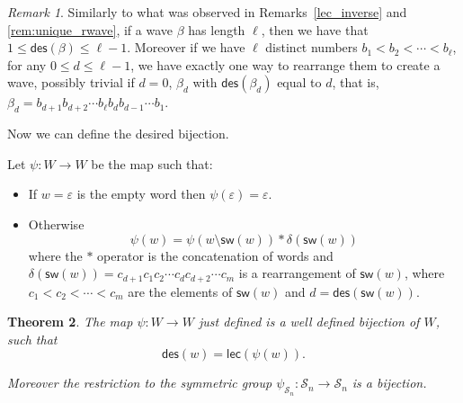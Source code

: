\documentclass[a4paper]{amsart}
\newcommand{\des}{\mathsf{des}}
\newcommand{\lec}{\mathsf{lec}}
\newcommand{\sw}{\mathsf{sw}}
\newtheorem{theorem}{Theorem}[section]
\theoremstyle{definition}
\theoremstyle{remark}
\newtheorem{remark}[theorem]{Remark}
\numberwithin{equation}{section}
\begin{document}
\begin{remark}\label{rem:unique_wave}
Similarly to what was observed in Remarks~\ref{lec_inverse} and \ref{rem:unique_rwave}, if a wave $\beta$ has length $\ell $, then we have that $1\leq\des(\beta)\leq\ell-1$. Moreover if we have $\ell$ distinct numbers $b_1<b_2<\cdots<b_{\ell}$, for any $0\leq d\leq\ell-1$, we have exactly one way to rearrange them to create a wave, possibly trivial if $d=0$, $\beta_d$ with $\des(\beta_d)$ equal to $d$, that is, ${\beta_d=b_{d+1}b_{d+2}\cdots b_{\ell}b_db_{d-1}\cdots b_1}$.
\end{remark}

Now we can define the desired bijection.

Let $\psi:W\to W$ be the map such that:
\begin{itemize}
    \item If $w=\varepsilon$ is the empty word then $\psi(\varepsilon)=\varepsilon$.
    \item Otherwise
    \begin{equation}
        \psi(w)=\psi(w\setminus\sw(w))*\delta(\sw(w))
    \end{equation}
    where the $*$ operator is the concatenation of words and $\delta(\sw(w))=c_{d+1}c_1c_2\cdots c_dc_{d+2}\cdots c_m$ is a rearrangement of $\sw(w)$, where $c_1<c_2<\cdots<c_m$ are the elements of $\sw(w)$ and $d=\des(\sw(w))$.
\end{itemize}

\begin{theorem}\label{thm:bijection}
    The map $\psi:W\to W$ just defined is a well defined bijection of $W$, such that \begin{equation}
        \des(w)=\lec(\psi(w)).\label{eq:des_lec}
        \end{equation}

    Moreover the restriction to the symmetric group $\psi_{\mathcal{S}_n}:\mathcal{S}_n\to \mathcal{S}_n$ is a bijection.
\end{theorem}
\end{document}
